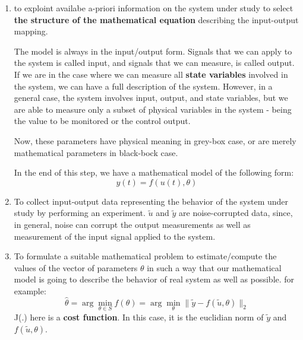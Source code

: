 \begin{enumerate}
    \item to exploint availabe a-priori information on the system under study to select \textbf{the structure of the mathematical equation} describing the input-output mapping.
    \begin{factbox}
The model is always in the input/output form. Signals that we can apply to the system is called input, and signals that we can measure, is called output. If we are in the case where we can measure all \textbf{state variables} involved in the system, we can have a full description of the system. However, in a general case, the system involves input, output, and state variables, but we are able to measure only a subset of physical variables in the system - being the value to be monitored or the control output.

Now, these parameters have physical meaning in grey-box case, or are merely mathematical parameters in black-bock case.
\end{factbox}

In the end of this step, we have a mathematical model of the following form:
\begin{equation}
y(t) = f\left( u(t), \theta\right)
\end{equation}

    \item To collect input-output data representing the behavior of the system under study by performing an experiment. $\tilde{u}$ and $\tilde{y}$ are noise-corrupted data, since, in general, noise can corrupt the output measurements as well as measurement of the input signal applied to the system.
\begin{center}\end{center}
    \item To formulate a suitable mathematical problem to estimate/compute the values of the vector of parameters $\theta$ in such a way that our mathematical model is going to describe the behavior of real system as well as possible.
for example:
\[
\hat{\theta} = \arg \min\limits_{\theta \in S} f(\theta) = \arg \min\limits_{\theta} \|\tilde{y} - f(\tilde{u}, \theta)\|_2
\] 
J(.) here is a \textbf{cost function}. In this case, it is the euclidian norm of $\tilde{y}$ and $f(\tilde{u}, \theta)$.\\
\end{enumerate}
